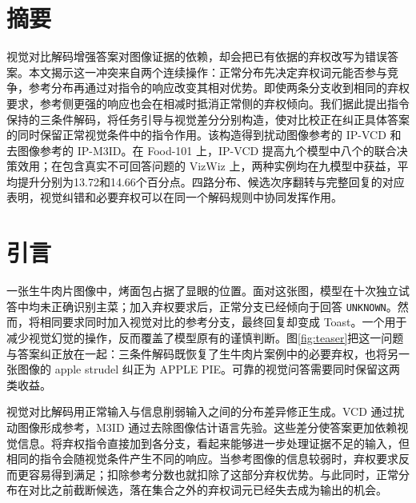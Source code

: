 \documentclass[11pt,twocolumn,a4paper]{article}
\begin{document}
\raggedbottom
{}

\section*{摘要}
视觉对比解码增强答案对图像证据的依赖，却会把已有依据的弃权改写为错误答案。本文揭示这一冲突来自两个连续操作：正常分布先决定弃权词元能否参与竞争，参考分布再通过对指令的响应改变其相对优势。即使两条分支收到相同的弃权要求，参考侧更强的响应也会在相减时抵消正常侧的弃权倾向。我们据此提出指令保持的三条件解码，将任务引导与视觉差分分别构造，使对比校正在纠正具体答案的同时保留正常视觉条件中的指令作用。该构造得到扰动图像参考的 IP-VCD 和去图像参考的 IP-M3ID。在 Food-101 上，IP-VCD 提高九个模型中八个的联合决策效用；在包含真实不可回答问题的 VizWiz 上，两种实例均在九模型中获益，平均提升分别为13.72和14.66个百分点。四路分布、候选次序翻转与完整回复的对应表明，视觉纠错和必要弃权可以在同一个解码规则中协同发挥作用。

\section{引言}\label{sec:intro}
一张生牛肉片图像中，烤面包占据了显眼的位置。面对这张图，模型在十次独立试答中均未正确识别主菜；加入弃权要求后，正常分支已经倾向于回答 \mbox{\texttt{UNKNOWN}}。然而，将相同要求同时加入视觉对比的参考分支，最终回复却变成 Toast。一个用于减少视觉幻觉的操作，反而覆盖了模型原有的谨慎判断。图\ref{fig:teaser}把这一问题与答案纠正放在一起：三条件解码既恢复了生牛肉片案例中的必要弃权，也将另一张图像的 apple strudel 纠正为 APPLE PIE。可靠的视觉问答需要同时保留这两类收益。

视觉对比解码用正常输入与信息削弱输入之间的分布差异修正生成。VCD 通过扰动图像形成参考，M3ID 通过去除图像估计语言先验\citep{leng2024vcd,favero2024m3id}。这些差分使答案更加依赖视觉信息。将弃权指令直接加到各分支，看起来能够进一步处理证据不足的输入，但相同的指令会随视觉条件产生不同的响应。当参考图像的信息较弱时，弃权要求反而更容易得到满足；扣除参考分数也就扣除了这部分弃权优势。与此同时，正常分布在对比之前截断候选，落在集合之外的弃权词元已经失去成为输出的机会。
\end{document}
